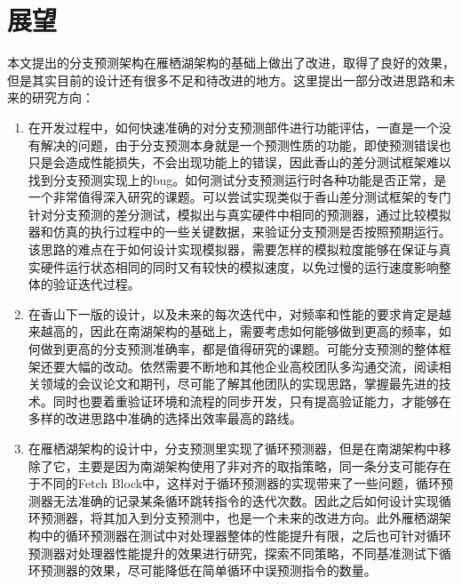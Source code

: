 \section{展望}

本文提出的分支预测架构在雁栖湖架构的基础上做出了改进，取得了良好的效果，但是其实目前的设计还有很多不足和待改进的地方。这里提出一部分改进思路和未来的研究方向：

\begin{enumerate}
    \item 在开发过程中，如何快速准确的对分支预测部件进行功能评估，一直是一个没有解决的问题，由于分支预测本身就是一个预测性质的功能，即使预测错误也只是会造成性能损失，不会出现功能上的错误，因此香山的差分测试框架难以找到分支预测实现上的bug。如何测试分支预测运行时各种功能是否正常，是一个非常值得深入研究的课题。可以尝试实现类似于香山差分测试框架的专门针对分支预测的差分测试，模拟出与真实硬件中相同的预测器，通过比较模拟器和仿真的执行过程中的一些关键数据，来验证分支预测是否按照预期运行。该思路的难点在于如何设计实现模拟器，需要怎样的模拟粒度能够在保证与真实硬件运行状态相同的同时又有较快的模拟速度，以免过慢的运行速度影响整体的验证迭代过程。
    \item 在香山下一版的设计，以及未来的每次迭代中，对频率和性能的要求肯定是越来越高的，因此在南湖架构的基础上，需要考虑如何能够做到更高的频率，如何做到更高的分支预测准确率，都是值得研究的课题。可能分支预测的整体框架还要大幅的改动。依然需要不断地和其他企业高校团队多沟通交流，阅读相关领域的会议论文和期刊，尽可能了解其他团队的实现思路，掌握最先进的技术。同时也要着重验证环境和流程的同步开发，只有提高验证能力，才能够在多样的改进思路中准确的选择出效率最高的路线。
    \item 在雁栖湖架构的设计中，分支预测里实现了循环预测器，但是在南湖架构中移除了它，主要是因为南湖架构使用了非对齐的取指策略，同一条分支可能存在于不同的Fetch Block中，这样对于循环预测器的实现带来了一些问题，循环预测器无法准确的记录某条循环跳转指令的迭代次数。因此之后如何设计实现循环预测器，将其加入到分支预测中，也是一个未来的改进方向。此外雁栖湖架构中的循环预测器在测试中对处理器整体的性能提升有限，之后也可针对循环预测器对处理器性能提升的效果进行研究，探索不同策略，不同基准测试下循环预测器的效果，尽可能降低在简单循环中误预测指令的数量。
\end{enumerate}

